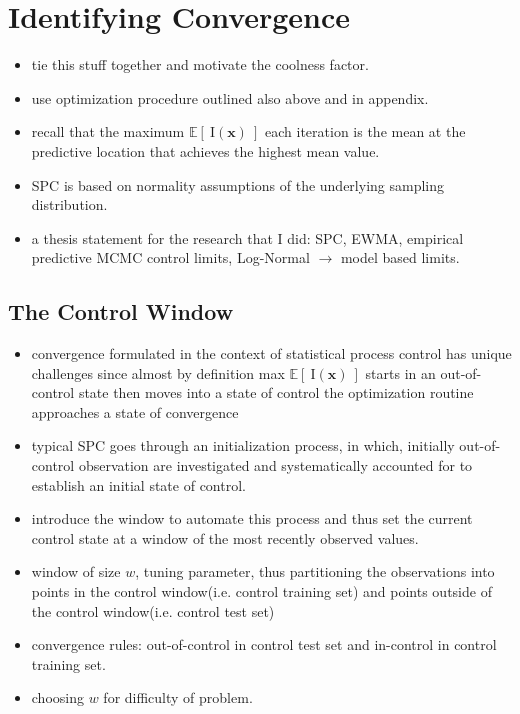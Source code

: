 \documentclass[12pt]{article}
\def \EIx {
	\mathbb{E}\left[~\text{I}(\bm{x})~\right]
}
\begin{document}
\section{Identifying Convergence}
	\begin{itemize}
	\item tie this stuff together and motivate the coolness factor. 
	\item use optimization procedure outlined \cite{tgp2} also above and in appendix.
	\item recall that the maximum $\EIx$ each iteration is the mean at the predictive location that achieves the highest mean value.  
	\item SPC is based on normality assumptions of the underlying sampling distribution.
	\item a thesis statement for the research that I did: SPC, EWMA, empirical predictive MCMC control limits, Log-Normal $\rightarrow$ model based limits.
	\end{itemize}
	\subsection{The Control Window}
		\begin{itemize}
		\item convergence formulated in the context of statistical process control has unique challenges since almost by definition max $\EIx$ starts in an out-of-control state then moves into a state of control the optimization routine approaches a state of convergence%
		\item typical SPC goes through an initialization process, in which, initially out-of-control observation are investigated and systematically accounted for to establish an initial state of control.
		\item introduce the window to automate this process and thus set the current control state at a window of the most recently observed values.
		\item window of size $w$, tuning parameter, thus partitioning the observations into points in the control window(i.e. control training set) and points outside of the control window(i.e. control test set)
		\item convergence rules: out-of-control in control test set and in-control in control training set.
		\item choosing $w$ for difficulty of problem. 
		\end{itemize}
\end{document}
